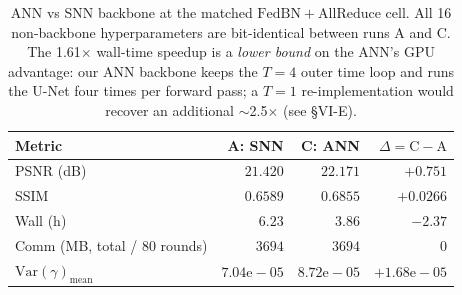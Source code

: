 %

\begin{table}[t]
\centering
\caption{ANN vs SNN backbone at the matched
$\mathrm{FedBN}\!+\!\mathrm{AllReduce}$ cell. All 16 non-backbone
hyperparameters are bit-identical between runs A and C. The 1.61$\times$
wall-time speedup is a \emph{lower bound} on the ANN's GPU advantage:
our ANN backbone keeps the $T\!=\!4$ outer time loop and runs the U-Net
four times per forward pass; a $T\!=\!1$ re-implementation would
recover an additional $\sim$2.5$\times$ (see \S VI-E).}
\label{tab:ann_vs_snn}
\renewcommand{\arraystretch}{1.10}
\setlength{\tabcolsep}{6pt}
\begin{tabular}{l r r r}
\toprule
Metric & A: SNN & C: ANN & $\Delta = \mathrm{C}\!-\!\mathrm{A}$ \\
\midrule
PSNR (dB)                  & $21.420$  & $\mathbf{22.171}$ & $\mathbf{+0.751}$ \\
SSIM                       & $0.6589$  & $\mathbf{0.6855}$ & $\mathbf{+0.0266}$ \\
Wall (h)                   & $6.23$    & $\mathbf{3.86}$   & $\mathbf{-2.37}$  \\
Comm (MB, total / 80 rounds)        & $3694$    & $3694$            & $0$ \\
$\mathrm{Var}(\gamma)_{\text{mean}}$
                           & $7.04\mathrm{e}{-}05$
                           & $8.72\mathrm{e}{-}05$
                           & $+1.68\mathrm{e}{-}05$ \\
\bottomrule
\end{tabular}
\end{table}
